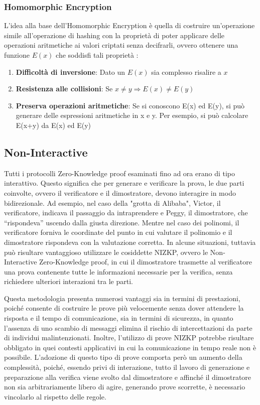 \subsubsection{Homomorphic Encryption}

L'idea alla base dell'Homomorphic Encryption è quella di costruire un'operazione simile all'operazione di hashing con la
proprietà di poter applicare delle operazioni aritmetiche ai valori criptati senza decifrarli, ovvero ottenere una
funzione $E(x)$ che soddisfi tali proprietà :
\begin{enumerate}
    \item \textbf{Difficoltà di inversione}: Dato un  $E(x)$ sia complesso risalire a $x$
    \item \textbf{Resistenza alle collisioni}: Se $x \ne y \Rightarrow E(x) \ne E(y)$
    \item \textbf{Preserva operazioni aritmetiche}: Se si conoscono E(x) ed E(y), si può generare
    delle espressioni aritmetiche in x e y. Per esempio, si può calcolare E(x+y) da E(x) ed E(y)
\end{enumerate}
\clearpage

\subsection{Non-Interactive}
\label{sec:non-interactive}

Tutti i protocolli Zero-Knowledge proof esaminati fino ad ora erano di tipo interattivo. Questo significa che per
generare e verificare la prova, le due parti coinvolte, ovvero il verificatore e il dimostratore, devono interagire in
modo bidirezionale. Ad esempio, nel caso della "grotta di Alibaba", Victor, il verificatore, indicava il passaggio da
intraprendere e Peggy, il dimostratore, che “rispondeva” uscendo dalla giusta direzione. Mentre nel caso dei
polinomi, il verificatore forniva le coordinate del punto in cui valutare il polinomio e il dimostratore rispondeva con
la valutazione corretta. In alcune situazioni, tuttavia può risultare vantaggioso utilizzare le cosiddette NIZKP, ovvero
le Non-Interactive Zero-Knowledge proof, in cui il dimostratore trasmette al verificatore una prova contenente tutte le
informazioni necessarie per la verifica, senza richiedere ulteriori interazioni tra le parti. 

Questa metodologia presenta numerosi vantaggi sia in termini di prestazioni, poiché consente di costruire le prove più
velocemente senza dover attendere la risposta e il tempo di comunicazione, sia in termini di sicurezza, in quanto
l'assenza di uno scambio di messaggi elimina il rischio di intercettazioni da parte di individui malintenzionati.
Inoltre, l'utilizzo di prove NIZKP potrebbe risultare obbligato in quei contesti applicativi in cui la comunicazione in
tempo reale non è possibile. L'adozione di questo tipo di prove comporta però un aumento della complessità, poiché,
essendo privi di interazione, tutto il lavoro di generazione e preparazione alla verifica viene svolto dal dimostratore
e affinché il dimostratore non sia arbitrariamente libero di agire, generando prove scorrette, è necessario vincolarlo
al rispetto delle regole. 

